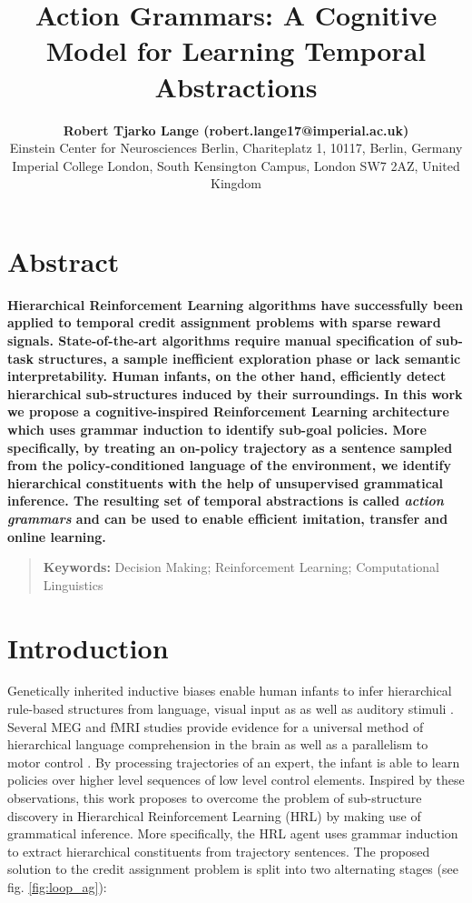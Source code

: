 \documentclass[10pt,letterpaper]{article}
\title{Action Grammars: A Cognitive Model for Learning Temporal Abstractions}
\author{{\large \bf Robert Tjarko Lange (robert.lange17@imperial.ac.uk)} \\
  Einstein Center for Neurosciences Berlin, Chariteplatz 1, 10117, Berlin, Germany \AND {\large \bf Aldo Faisal (a.faisal@imperial.ac.uk)} \\
  Imperial College London, South Kensington Campus, London SW7 2AZ, United Kingdom}
\begin{document}
\maketitle


\section{Abstract}
{
\bf
Hierarchical Reinforcement Learning algorithms have successfully been applied to temporal credit assignment problems with sparse reward signals. State-of-the-art algorithms require manual specification of sub-task structures,  a sample inefficient exploration phase or lack semantic interpretability. Human infants, on the other hand, efficiently detect hierarchical sub-structures induced by their surroundings.
In this work we propose a cognitive-inspired Reinforcement Learning architecture which uses grammar induction to identify sub-goal policies. More specifically, by treating an on-policy trajectory as a sentence sampled from the policy-conditioned language of the environment, we identify hierarchical constituents with the help of unsupervised grammatical inference. The resulting set of temporal abstractions is called \textit{action grammars} \cite{Pastra_2012} and can be used to enable efficient imitation, transfer and online learning.
}
\begin{quote}
\small
\textbf{Keywords:} 
Decision Making; Reinforcement Learning; Computational Linguistics
\end{quote}

\section{Introduction}

Genetically inherited inductive biases enable human infants to infer hierarchical rule-based structures from language, visual input as as well as auditory stimuli \cite{Frank_2009, Marcus_2007}. Several MEG and fMRI studies provide evidence for a universal method of hierarchical language comprehension in the brain \cite{Frank_2018, Brennan_2016, Nelson_2017} as well as a parallelism to motor control \cite{Pastra_2012, Stout_2018}. By processing trajectories of an expert, the infant is able to learn policies over higher level sequences of low level control elements.
Inspired by these observations, this work proposes to overcome the problem of sub-structure discovery in Hierarchical Reinforcement Learning (HRL) by making use of grammatical inference. More specifically, the HRL agent uses grammar induction to extract hierarchical constituents from trajectory sentences. The proposed solution to the credit assignment problem is split into two alternating stages (see fig. \ref{fig:loop_ag}):
\end{document}

